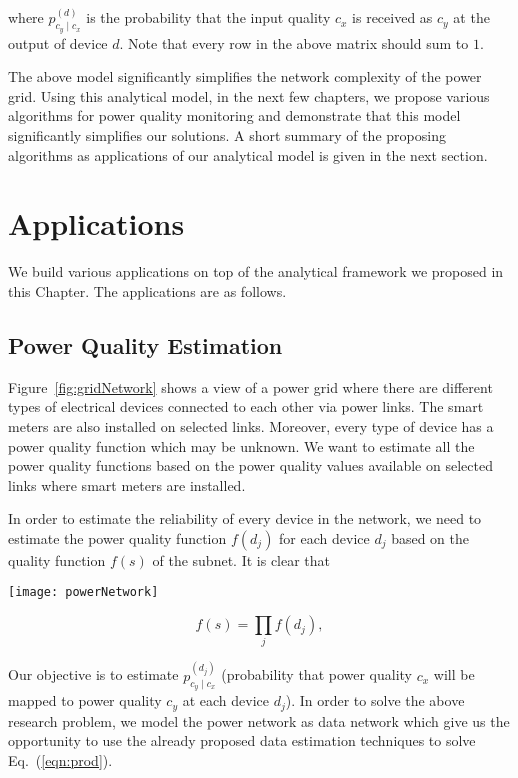 \noindent
where $p_{c_y \mid c_x}^{(d)}$ is the probability that the input quality $c_x$ is received as $c_y$ at the output of device $d$. Note that every row in the above matrix should sum to $1$. 

The above model significantly simplifies the network complexity of the power grid. Using this analytical model, in the next few chapters, we propose various algorithms for power quality monitoring and demonstrate that this model significantly simplifies our solutions. A short summary of the proposing algorithms as applications of our analytical model is given in the next section.

\section{Applications}
We build various applications on top of the analytical framework we proposed in this Chapter. The applications are as follows.

\subsection{Power Quality Estimation}
Figure~\ref{fig:gridNetwork} shows a view of a power grid where there are different types of electrical devices connected to each other via power links. The smart meters are also installed on selected links. Moreover, every type of device has a power quality function which may be unknown. We want to estimate all the power quality functions based on the power quality values available on selected links where smart meters are installed.

In order to estimate the reliability of every device in the network, we need to estimate the power quality function $f(d_j)$ for each device $d_j$ based on the quality function $f(s)$ of the subnet. It is clear that

\begin{landscape}
\begin{figure*}[!p]
    \centering
    \texttt{[image: powerNetwork]}
    \caption{A simple view of power microgrid}
    \label{fig:gridNetwork}
\end{figure*}
\end{landscape}

\begin{equation}
\label{eqn:prod}
f(s) = \prod_{j} f(d_j),
\end{equation}

Our objective is to estimate $p_{c_y \mid c_x}^{(d_j)}$ (probability that power quality $c_x$ will be mapped to power quality $c_y$ at each device $d_j$). In order to solve the above research problem, we model the power network as data network which give us the opportunity to use the already proposed data estimation techniques to solve Eq.~(\ref{eqn:prod}).


